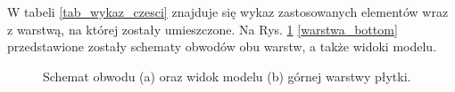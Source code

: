 \documentclass[12pt, twoside]{article} %
\numberwithin{equation}{subsection}
\numberwithin{figure}{section}
\numberwithin{table}{section}
\begin{document}
		\newpage
	
		W tabeli \ref{tab_wykaz_czesci}	znajduje się wykaz zastosowanych elementów wraz z warstwą, na której zostały umieszczone. Na Rys. \ref{warstwa_top} \ref{warstwa_bottom} przedstawione zostały schematy obwodów obu warstw, a także widoki modelu. 
	
		\begin{figure}[!h]
			\centering
			\caption{Schemat obwodu (a) oraz widok modelu (b) górnej warstwy płytki.}
			\label{warstwa_top}
		\end{figure} 		
		
\end{document}
